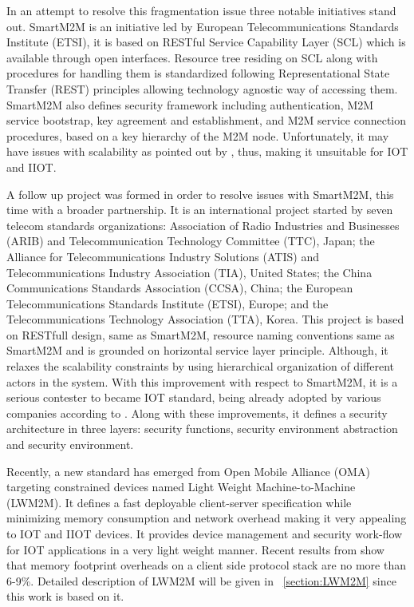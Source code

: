 In an attempt to resolve this fragmentation issue three notable initiatives stand out. SmartM2M is an initiative led by European Telecommunications Standards Institute (ETSI), it is based on RESTful Service Capability Layer (SCL) \cite{Alaya2014} which is available through open interfaces. Resource tree residing on SCL along with procedures for handling them is standardized following Representational State Transfer (REST) principles allowing technology agnostic way of accessing them. SmartM2M also defines security framework including  authentication, M2M service bootstrap, key agreement and establishment, and M2M service connection procedures, based on a key hierarchy of the M2M node\cite{ETSI1}. Unfortunately, it may have issues with scalability as pointed out by \cite{Grieco2014}, thus, making it unsuitable for IOT and IIOT. 

A follow up project was formed in order to resolve issues with SmartM2M, this time with a broader partnership. It is an international project started by seven telecom standards organizations: Association of Radio Industries and Businesses (ARIB) and Telecommunication Technology Committee (TTC), Japan; the Alliance for Telecommunications Industry Solutions (ATIS) and Telecommunications Industry Association (TIA), United States; the China Communications Standards Association (CCSA), China; the European Telecommunications Standards Institute (ETSI), Europe; and the Telecommunications Technology Association (TTA), Korea. This project is based on RESTfull design, same as SmartM2M, resource naming conventions same as SmartM2M and is grounded on horizontal service layer principle. Although, it relaxes the scalability constraints by using hierarchical organization of different actors in the system. With this improvement with respect to SmartM2M, it is a serious contester to became IOT standard, being already adopted by various companies according to \cite{Park2016}. Along with these improvements, it defines a security architecture in three layers: security functions, security environment abstraction and security environment.

Recently, a new standard has emerged from Open Mobile Alliance (OMA) targeting constrained devices named Light Weight Machine-to-Machine (LWM2M). It defines a fast deployable client-server specification while minimizing memory consumption and network overhead making it very appealing to IOT and IIOT devices. It provides device management and security work-flow for IOT applications in a very light weight manner. Recent results from \cite{Rao2015} show that memory footprint overheads on a client side protocol stack are no more than 6-9\%. Detailed description of LWM2M will be given in ~\ref{section:LWM2M} since this work is based on it.


